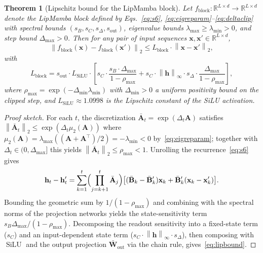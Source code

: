 \documentclass[12pt,a4paper]{article}
\newtheorem{theorem}{Theorem}
\theoremstyle{definition}
\theoremstyle{remark}
\newcommand{\modelname}{LipMamba}
\newcommand{\R}{\mathbb{R}}
\newcommand{\norm}[1]{\left\|#1\right\|}
\DeclareMathOperator{\SiLU}{SiLU}
\begin{document}
\begin{theorem}[Lipschitz bound for the \modelname{} block]
\label{thm:lip}
Let $f_{\mathrm{block}}: \R^{L \times d} \to \R^{L \times d}$ denote the \modelname{} block defined by Eqs.~\eqref{eq:s6}, \eqref{eq:eigreparam}--\eqref{eq:deltaclip} with spectral bounds $(s_B, s_C, s_\Delta, s_{\mathrm{out}})$, eigenvalue bounds $\lambda_{\max} \geq \lambda_{\min} > 0$, and step bound $\Delta_{\max} > 0$. Then for any pair of input sequences $\mathbf{x}, \mathbf{x}' \in \R^{L \times d}$,
\begin{equation}
    \norm{f_{\mathrm{block}}(\mathbf{x}) - f_{\mathrm{block}}(\mathbf{x}')}_2 \leq L_{\mathrm{block}} \cdot \norm{\mathbf{x} - \mathbf{x}'}_2,
\end{equation}
with
\begin{equation}
    L_{\mathrm{block}} = s_{\mathrm{out}} \cdot L_{\SiLU} \cdot \left[ s_C \cdot \frac{s_B \cdot \Delta_{\max}}{1 - \rho_{\max}} + s_C \cdot \norm{\mathbf{h}}_{\infty} \cdot s_\Delta \cdot \frac{\Delta_{\max}}{1 - \rho_{\max}} \right],
    \label{eq:lipbound}
\end{equation}
where $\rho_{\max} = \exp(-\Delta_{\min} \lambda_{\min})$ with $\Delta_{\min} > 0$ a uniform positivity bound on the clipped step, and $L_{\SiLU} \approx 1.0998$ is the Lipschitz constant of the SiLU activation.
\end{theorem}

\begin{proof}[Proof sketch]
For each $t$, the discretization $\bar{\mathbf{A}}_t = \exp(\Delta_t \mathbf{A})$ satisfies $\norm{\bar{\mathbf{A}}_t}_2 \leq \exp(\Delta_t \mu_2(\mathbf{A}))$ where $\mu_2(\mathbf{A}) = \lambda_{\max}((\mathbf{A} + \mathbf{A}^\top)/2) = -\lambda_{\min} < 0$ by~\eqref{eq:eigreparam}; together with $\Delta_t \in (0, \Delta_{\max}]$ this yields $\norm{\bar{\mathbf{A}}_t}_2 \leq \rho_{\max} < 1$. Unrolling the recurrence~\eqref{eq:s6} gives
\begin{equation}
    \mathbf{h}_t - \mathbf{h}_t' = \sum_{k=1}^t \Bigl(\prod_{j=k+1}^t \bar{\mathbf{A}}_j\Bigr) \bigl[(\bar{\mathbf{B}}_k - \bar{\mathbf{B}}_k') \mathbf{x}_k + \bar{\mathbf{B}}_k'(\mathbf{x}_k - \mathbf{x}_k')\bigr].
\end{equation}
Bounding the geometric sum by $1/(1 - \rho_{\max})$ and combining with the spectral norms of the projection networks yields the state-sensitivity term $s_B \Delta_{\max} / (1 - \rho_{\max})$. Decomposing the readout sensitivity into a fixed-state term ($s_C$) and an input-dependent state term ($s_C \cdot \norm{\mathbf{h}}_\infty \cdot s_\Delta$), then composing with $\SiLU$ and the output projection $\bar{\mathbf{W}}_{\mathrm{out}}$ via the chain rule, gives~\eqref{eq:lipbound}.
\end{proof}
\end{document}
